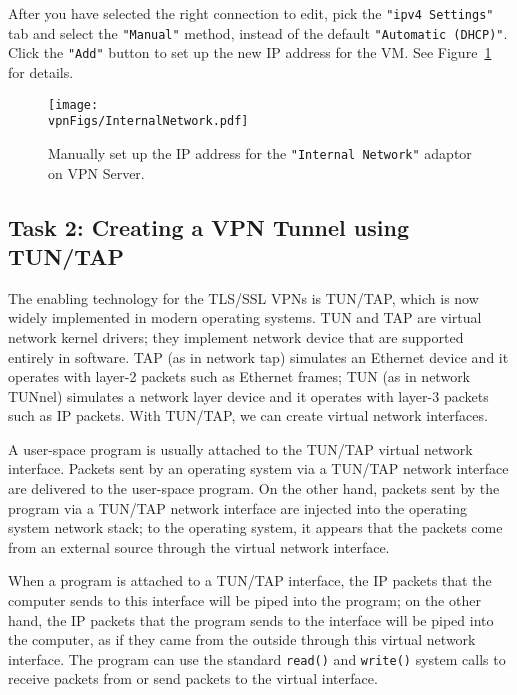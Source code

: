 After you have selected the right connection to edit, 
pick the \texttt{"ipv4 Settings"} tab and select the 
\texttt{"Manual"} method, instead of the default \texttt{"Automatic (DHCP)"}. Click 
the \texttt{"Add"} button to set up the new IP address for the VM. See
Figure~\ref{vpn:fig:internalnetwork} for details. 



\begin{figure}[htb]
\begin{center}
\texttt{[image: \\vpnFigs/InternalNetwork.pdf]}
\end{center}
\caption{Manually set up the IP address for the \texttt{"Internal Network"} adaptor on VPN
Server.}
\label{vpn:fig:internalnetwork}
\end{figure}
 


\subsection{Task 2: Creating a VPN Tunnel using TUN/TAP}



The enabling technology for the TLS/SSL VPNs is 
TUN/TAP, which is now widely implemented in modern operating systems.
TUN and TAP are virtual network kernel drivers; they 
implement network device that are supported entirely in software.
TAP (as in network tap) simulates an Ethernet device and it operates with 
layer-2 packets such as Ethernet frames; TUN (as in network TUNnel) simulates a
network layer device and it operates with layer-3 packets such as IP packets.
With TUN/TAP, we can create virtual network interfaces. 


A user-space program is usually attached to the TUN/TAP virtual network interface.
Packets sent by an operating system via a TUN/TAP network interface 
are delivered to the user-space program. On the other hand,
packets sent by the program
via a TUN/TAP network interface are injected into the operating system
network stack; to the operating system,
it appears that the packets come from an external source
through the virtual network interface.


When a program is attached to a TUN/TAP interface, the IP packets that 
the computer sends to this interface will be piped into the 
program; on the other hand, the IP packets that the program sends to the 
interface will be piped into the computer, as if they came from 
the outside through this virtual network interface. The program can use 
the standard {\tt read()} and {\tt write()} system calls to receive packets 
from or send packets to the virtual interface.


